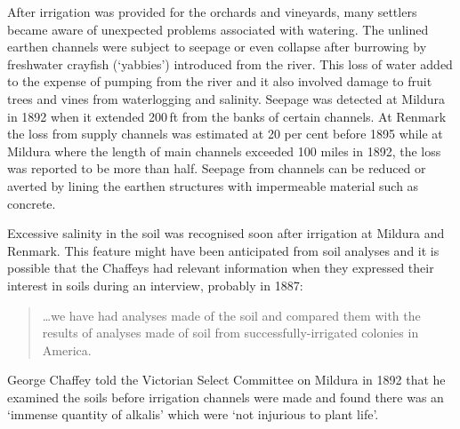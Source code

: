 After irrigation was provided for the orchards and vineyards, many
settlers became aware of unexpected problems associated with watering.
The unlined earthen channels were subject to seepage or even collapse
after burrowing by freshwater crayfish (`yabbies') introduced from the
river.  This loss of water added to the expense of pumping from the
river and it also involved damage to fruit trees and vines from
waterlogging and salinity.  Seepage was detected at Mildura in 1892
when it extended 200\,ft from the banks of certain channels.  At
Renmark the loss from supply channels was estimated at 20 per cent
before 1895 while at Mildura where the length of main channels
exceeded 100 miles in 1892, the loss was reported to be more than
half. Seepage from channels can be reduced or averted by lining the
earthen structures with impermeable material such as
concrete.

Excessive salinity in the soil was recognised soon after irrigation at
Mildura and Renmark.  This feature might have been anticipated from
soil analyses and it is possible that the Chaffeys had relevant
information when they expressed their interest in soils during an
interview, probably in 1887:
\begin{quote}
	\ldots we have had analyses made of the soil and compared them
	with the results of analyses made of soil from
	successfully-irrigated colonies in America.
\end{quote}
George Chaffey told the Victorian Select Committee on Mildura in 1892
that he examined the soils before irrigation channels were made and
found there was an `immense quantity of alkalis' which were `not
injurious to plant life'.

